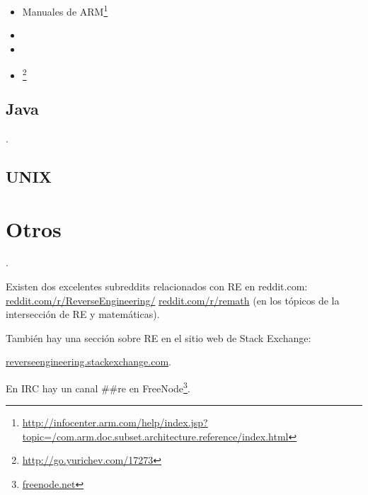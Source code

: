 \begin{itemize}
\item Manuales de ARM\footnote{\AlsoAvailableAs \url{http://infocenter.arm.com/help/index.jsp?topic=/com.arm.doc.subset.architecture.reference/index.html}}

\item \ARMSevenRef

\item \ARMSixFourRefURL

\item \ARMCookBook\footnote{\AlsoAvailableAs \url{http://go.yurichev.com/17273}}
\end{itemize}

\subsection{Java}

\JavaBook.

\subsection{UNIX}

\TAOUP



\section{Otros}

\HenryWarren.

Existen dos excelentes subreddits relacionados con \ac{RE} en reddit.com:
\href{http://go.yurichev.com/17027}{reddit.com/r/ReverseEngineering/} \ESph{}
\href{http://go.yurichev.com/17028}{reddit.com/r/remath}
(en los t\'opicos de la intersecci\'on de \ac{RE} y matem\'aticas).

Tambi\'en hay una secci\'on sobre \ac{RE} en el sitio web de Stack Exchange:

\par
\href{http://go.yurichev.com/17029}{reverseengineering.stackexchange.com}.

En IRC hay un canal \#\#re en
FreeNode\footnote{\href{http://go.yurichev.com/17030}{freenode.net}}.

